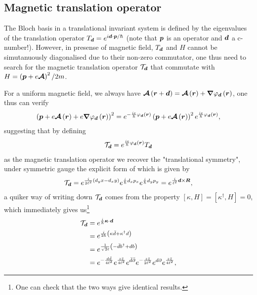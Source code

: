 \documentclass[%
nofootinbib,
 amsmath,amssymb,
 aps,onecolumn,
prb
]{revtex4-2}
\newcommand{\zz}{\bar{z}}
\newcommand{\mA}{\mathcal{A}}
\begin{document}
\subsection{Magnetic translation operator}
The Bloch basis in a translational invariant system is defined by the eigenvalues of the translation operator $T_{\vb*{d}}=e^{i\vb*{d}\cdot \vb*{p}/\hbar}$ (note that $\vb*{p}$ is an operator and $\vb*{d}$ a c-number!). However, in presense of magnetic 
field, $T_{\vb*{d}}$ and $H$ cannot be simutanuously diagonalised due to their non-zero commutator, one thus need to search for the magnetic translation operator $\mathcal{T}_{\vb*{d}}$ that 
commutate with $H=\left(\vb*{p}+e\vb*{\mathcal{A}}\right)^2/2m$. \par 
For a uniform magnetic field, we always have $\vb*{\mathcal{A}}\left(\vb*{r}+\vb*{d}\right)=\vb*{\mA}\left(\vb*{r}\right)+\grad\varphi_{\vb*{d}} \left(\vb*{r}\right)$, one thus can verify
\begin{equation}
    \left(\vb*{p}+e\vb*{\mathcal{A}}\left(\vb*{r}\right)+e\grad\varphi_{\vb*{d}}\left(\vb*{r}\right)\right)^2=e^{-\frac{ie}{\hbar}\varphi_{\vb*{d}}\left(\vb*{r}\right)}\left(\vb*{p}+e\vb*{\mathcal{A}}\left(\vb*{r}\right)\right)^2 e^{\frac{ie}{\hbar}\varphi_{\vb*{d}}\left(\vb*{r}\right)},
\end{equation}
suggesting that by defining
\begin{equation}
    \mathcal{T}_{\vb*{d}}=e^{\frac{ie}{\hbar}\varphi_{\vb*{d}}\left(\vb*{r}\right)}T_{\vb*{d}}
\end{equation}
as the magnetic translation operator we recover the "translational symmetry", under symmetric gauge the explicit form of which is given by 
\begin{align}
    \mathcal{T}_{\vb*{d}}=e^{\frac{i}{2\ell^2}\left(d_yx-d_xy\right)}e^{\frac{i}{\hbar}d_xp_x}e^{\frac{i}{\hbar}d_yp_y}=e^{\frac{i}{\ell^2}\vb*{d}\times\vb*{R}},
\end{align}
a quiker way of writing down $\mathcal{T}_{\vb*{d}}$ comes from the property $[\kappa,H]=[\kappa^\dag,H]=0$, which immediately gives us\footnote{One can check that the two ways give identical results.}
\begin{align}
    \mathcal{T}_{\vb*{d}}&=e^{\frac{i}{\hbar}\vb*{\kappa}\cdot\vb*{d}}\nonumber\\ 
    &=e^{\frac{i}{2\hbar}\left(\kappa \bar{d}+\kappa^\dag d\right)}\nonumber\\ 
    &=e^{\frac{1}{\sqrt{2}\ell}\left(-\bar{d}b^\dag+db\right)}\nonumber\\ 
    &=e^{-\frac{d\bar{d}}{4\ell^2}}e^{\frac{z\zz}{4\ell^2}}e^{\bar{d} \bar{\partial}}e^{-\frac{z\zz}{2\ell^2}}e^{d\partial}e^{\frac{z\zz}{4\ell^2}},
\end{align}
\end{document}
